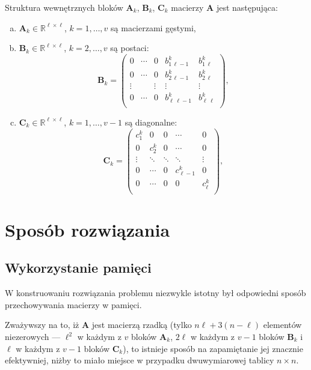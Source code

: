 \documentclass{classrep}
\newcommand{\mA}{\bm{A}}
\newcommand{\mB}{\bm{B}}
\newcommand{\mC}{\bm{C}}
\newcommand{\R}{\mathbb{R}}
\begin{document}
		Struktura wewnętrznych bloków $\mA_k$, $\mB_k$, $\mC_k$ macierzy $\mA$ jest następująca:
		\begin{enumerate}[(a)]
			\item $\mA_k \in \R^{\ell\times \ell}$,   $k = 1, \ldots,v$ są macierzami gęstymi,
			\item $\mB_k \in \R^{\ell\times \ell}$,   $k = 2, \ldots,v$ są postaci:
			$$
				\mB_k =
				\left(\begin{array}{ccccc}
				0 & \cdots & 0 & b_{1\,\ell-1}^k & b_{1\,\ell}^k \\
				0 & \cdots & 0 & b_{2\,\ell-1}^k & b_{2\,\ell}^k \\
				\vdots & & \vdots & \vdots & \vdots \\
				0 & \cdots & 0 & b_{\ell\,\ell-1}^k & b_{\ell\,\ell}^k \\
				\end{array}\right),
			$$ 
			\item $\mC_k \in \R^{\ell\times \ell}$,   $k = 1, \ldots,v\!-\!1$ są diagonalne:
			$$
				\mC_k =
				\left(\begin{array}{ccccc}
				 c_{1}^k & 0 & 0 & \cdots & 0  \\
				0 &  c_{2}^k &  0 & \cdots & 0  \\
				\vdots &  \ddots &  \ddots & \ddots & \vdots  \\
				0 & \cdots & 0 &  c_{\ell-1}^k & 0 \\
				0 & \cdots & 0 &  0 & c_{\ell}^k \\
				\end{array}\right),
			$$ 
		\end{enumerate}
\section{Sposób rozwiązania}
	\subsection{Wykorzystanie pamięci}

	W konstruowaniu rozwiązania problemu niezwykle istotny był odpowiedni sposób przechowywania macierzy w pamięci.
	
	Zważywszy na to, iż $\mA$ jest macierzą rzadką (tylko $n \ell + 3(n - \ell)$ elementów niezerowych --- $\ell^2$ w każdym z $v$ bloków $\mA_k$, $2\ell$ w każdym z $v-1$ bloków $\mB_k$ i $\ell$ w każdym z $v-1$ bloków $\mC_k$), to istnieje sposób na zapamiętanie jej znacznie efektywniej, niżby to miało miejsce w przypadku dwuwymiarowej tablicy $n\times n$. 
	
\end{document}
